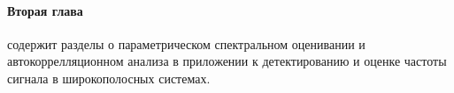\paragraph{Вторая глава} содержит разделы о параметрическом спектральном оценивании и автокоррелляционном анализа в приложении к детектированию и оценке
частоты сигнала в широкополосных системах.
